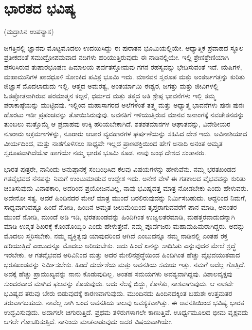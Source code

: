 
\chapter{ಭಾರತದ ಭವಿಷ್ಯ}

\begin{center}
(ಮದ್ರಾಸಿನ ಉಪನ್ಯಾಸ)
\end{center}

ಜಗತ್ತಿನಲ್ಲಿ ಜ್ಞಾನವು ಮೊಟ್ಟಮೊದಲು ಉದಯಿಸಿದ್ದು ಈ ಪುರಾತನ ಭೂಮಿಯಲ್ಲಿಯೇ. ಆಧ್ಯಾತ್ಮಿಕ ಪ್ರವಾಹದ ಸ್ಥೂಲ ಪ್ರತೀಕದಂತೆ ಸಮುದ್ರೋಪಮವಾದ ನದಿಗಳು ಹರಿಯುತ್ತಿರುವುದು ಈ ನಾಡಿನಲ್ಲಿಯೇ. ಇಲ್ಲಿ ಶ್ರೇಣಿಶ್ರೇಣಿಯಾಗಿ ಪಸರಿಸಿರುವ ತುಷಾರಭೂಷಣ ಹಿಮಾಲಯ ಪರ್ವತಸ್ತೋಮವು ಗಗನ ರಹಸ್ಯವನ್ನು ಭೇದಿಸುವಂತೆ ಇದೆ. ಋಷಿಗಳ, ಮಹಾಮುನಿಗಳ ಪಾದಧೂಳಿ ಸೋಂಕಿದ ಪವಿತ್ರ ಭೂಮಿ ಇದು. ಮಾನವನ ಸ್ವರೂಪ ಮತ್ತು ಅಂತರ್ಜಗತ್ತನ್ನು ಕುರಿತು ಜಿಜ್ಞಾಸೆ ಮೊದಲಾದುದು ಇಲ್ಲಿ. ಆತ್ಮದ ಅಮರತ್ವ, ಅಂತರ್ಯಾಮಿ ಈಶ್ವರ, ಜಗತ್ತು ಮತ್ತು ಜೀವಿಗಳಲ್ಲಿ ಓತಪ್ರೋತನಾಗಿರುವ ಪರಮಾತ್ಮನ ಕಲ್ಪನೆ, ಧರ್ಮದ ಮತ್ತು ತತ್ತ್ವದ ಅತಿ ಶ್ರೇಷ್ಠ ಭಾವನೆಗಳು ಇಲ್ಲಿ ತಮ್ಮ ಪರಾಕಾಷ್ಠೆಯನ್ನು ಮುಟ್ಟಿದವು. ಇಲ್ಲಿಂದ ಮಹಾಸಾಗರದ ಅಲೆಗಳಂತೆ ತತ್ತ್ವ ಮತ್ತು ಅಧ್ಯಾತ್ಮ ಭಾವನೆಗಳು ಪುನಃ ಪುನಃ ಹೊರಟು ಇಡೀ ಪ್ರಪಂಚವನ್ನು ತೋಯಿಸಿರುವುವು. ಅವನತಿಗೆ ಇಳಿಯುತ್ತಿರುವ ಮಾನವ ಜನಾಂಗಕ್ಕೆ ನವಚೇತನವನ್ನು ತುಂಬಲು ಮತ್ತೊಮ್ಮೆ ಆ ಪ್ರವಾಹವು ಉಕ್ಕಿ ಹರಿಯಬೇಕಾಗಿದೆ. ಶತಶತಮಾನಗಳ ಆಘಾತವನ್ನು, ವಿದೇಶೀಯರ ನೂರಾರು ಆಕ್ರಮಣಗಳನ್ನು, ನೂರಾರು ಆಚಾರ ವ್ಯವಹಾರಗಳ ಘರ್ಷಣೆಯನ್ನು ಸಹಿಸಿದ ದೇಶ ಇದು. ಅವಿನಾಶಿಯಾದ ವೀರ್ಯದಿಂದ, ಮತ್ತು ನಾಶಗೊಳಿಸಲು ಸಾಧ್ಯವೇ ಇಲ್ಲದ ಪ್ರಾಣಶಕ್ತಿಯಿಂದ ಹೇಗೆ ಅನಾದಿ ಅನಂತ ಅಮೃತ ಸ್ವರೂಪವಾಗಿದೆಯೋ ಹಾಗೆಯೇ ನಮ್ಮ ಭಾರತ ಭೂಮಿ ಕೂಡ. ನಾವು ಅಂಥ ದೇಶದ ಸಂತಾನರು.

ಭಾರತ ಪುತ್ರರೇ, ನಾನಿಂದು ಅನುಷ್ಠಾನಕ್ಕೆ ಸಂಬಂಧಿಸಿದ ಕೆಲವು ವಿಷಯಗಳನ್ನು ಹೇಳುವೆನು. ನಮ್ಮ ಭರತಖಂಡದ ಗತವೈಭವದ ನೆನಪನ್ನು ನಿಮಗೆ ಉಂಟುಮಾಡುವ ಉದ್ದೇಶ ಇದು. ಅನೇಕ ವೇಳೆ ಈ ಗತಕಾಲದ ವೈಭವವನ್ನು ಕುರಿತು ಚಿಂತಿಸುವುದು ವಿನಾಶ\-ಕಾರಿ, ಅದರಿಂದ ಪ್ರಯೋಜನವಿಲ್ಲ, ನಾವು ಭವಿಷ್ಯದತ್ತ ಮಾತ್ರ ನೋಡಬೇಕು ಎಂದು ಹೇಳುವರು. ಅದೇನೋ ಸತ್ಯ. ಆದರೆ ಹಿಂದಿನದರ ಮೇಲೆ ಮಾತ್ರ ಮುಂದೆ ಬರಲಿರುವು\-ದನ್ನು ನಿರ್ಮಿಸಬಹುದು. ಆದ್ದರಿಂದ ನಿಮಗೆ, ಸಾಧ್ಯವಾಗುವಷ್ಟೂ ಹಿಂದೆ ನೋಡಿ, ಹಿಂದಿನ ಅಮೃತ ಚಿಲುಮೆಯಿಂದ ತೃಪ್ತರಾಗುವವರೆಗೆ ಪಾನ ಮಾಡಿ, ಅನಂತರ ಮುಂದೆ ನೋಡಿ, ಮುಂದೆ ಅಡಿ ಇಡಿ, ಭರತಖಂಡವನ್ನು ಹಿಂದಿಗಿಂತ ಉಜ್ವಲತರಮಾಡಿ, ಮಹತ್ತರ\-ವಾದುದನ್ನಾಗಿ ಮಾಡಿ ಉನ್ನತ ಶಿಖರಕ್ಕೆ ಕೊಂಡೊಯ್ಯಿರಿ ಎಂದು ಹೇಳುತ್ತೇನೆ. ನಮ್ಮ ಪೂರ್ವಜರು ಮಹಾಮಹಿಮರಾಗಿದ್ದರು. ಅದನ್ನು ಮೊದಲು ಸ್ಮರಿಸಬೇಕು. ನಮ್ಮ ವ್ಯಕ್ತಿತ್ವವು ಯಾವುದರಿಂದ ಆಗಿದೆ ಎಂಬುದನ್ನೂ ನಮ್ಮ ನಾಡಿನಲ್ಲಿ ಎಂತಹ ರಕ್ತ ಹರಿಯುತ್ತಿದೆ ಎಂಬುದನ್ನೂ ಮೊದಲು ಅರಿಯಬೇಕು. ಅದು ಹಿಂದೆ ಏನನ್ನು ಸಾಧಿಸಿತು ಎನ್ನುವುದರ ಮೇಲೆ ಶ್ರದ್ಧೆ ಇರಬೇಕು. ಆ ಗತವೈಭವದ ಅರಿವಿನಿಂದ ಮತ್ತು ಅದರ ಮೇಲಿನಶ್ರದ್ಧೆಯಿಂದ ಹಿಂದಿಗಿಂತ ಹೆಚ್ಚು ವೈಭವಯುತವಾದ ಭರತಖಂಡವನ್ನು ನಿರ್ಮಿಸಬೇಕು. ಹಿಂದೆ ದುರ್ದೆಶೆಯ ಮತ್ತು ಅವನತಿಯ ಸಮಯ ಇತ್ತು. ನಮಗೆ ಅದೆಲ್ಲ ಗೊತ್ತಿದೆ. ಅದಕ್ಕೆ ಹೆಚ್ಚು ಪ್ರಾಮುಖ್ಯವನ್ನು ನಾನು ಕೊಡುವುದಿಲ್ಲ. ಅಂತಹ ಸಮಯಗಳು ಅವಶ್ಯವಾಗಿದ್ದವು. ವಿಶಾಲವೃಕ್ಷವು ಸುಂದರವಾದ ಮಾಗಿದ ಫಲವನ್ನು ಕೊಡುವುದು. ಅದು ನೆಲಕ್ಕೆ ಬಿದ್ದು, ಕೊಳೆತು, ನಾಶವಾಗುವುದು. ಆ ನಾಶವೇ ಭವಿಷ್ಯದ ತರುವು ಬೇರು ಬಿಡುವುದಕ್ಕೆ ಕಾರಣವಾಗುವುದು. ಮುಂದಿನದು ಹಿಂದಿನದಕ್ಕಿಂತ ಬಹುಶಃ ಉತ್ತಮತರ ತರುವಾಗಬಹುದು. ನಾವೆಲ್ಲ ಸಾಗಿ ಬಂದ ಅವನತಿಯ ಕಾಲವು ಅವಶ್ಯಕವಾಗಿತ್ತು. ಈ ಅವನತಿಯಿಂದ ಭವಿಷ್ಯ ಭಾರತ ಉದ್ಭವಿಸುವುದು. ಅದಾಗಲೇ ಚಿಗುರುತ್ತಿದೆ. ಪ್ರಥಮ ತಳಿರುಗಳಾಗಲೇ ಕಾಣುತ್ತಿವೆ. ಊರ್ಧ್ವಮೂಲದ ಭೀಮ ವೃಕ್ಷವದು ಆಗಲೇ ಗೋಚರಿಸುತ್ತಿದೆ. ನಾನಿಂದು ಮಾತನಾಡುವುದು ಅದರ ವಿಷಯವಾಗಿಯೇ.

